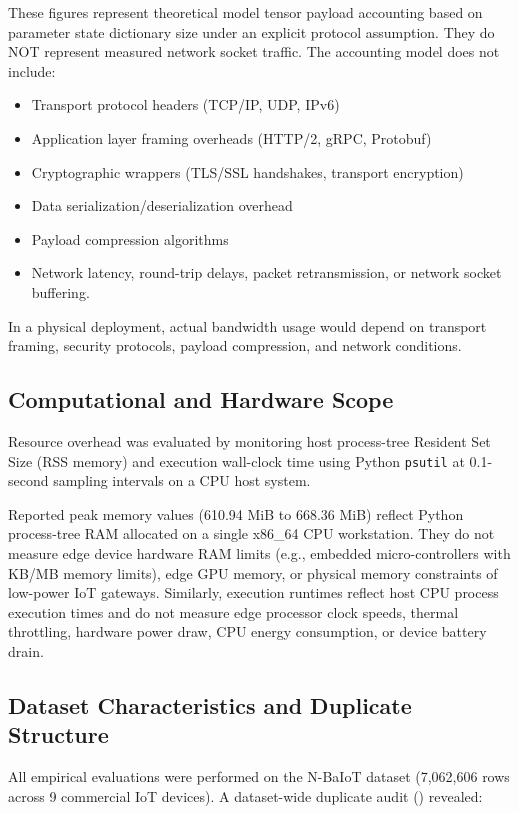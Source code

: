 \documentclass[11pt,a4paper]{article}
\begin{document}
These figures represent theoretical model tensor payload accounting based on parameter state dictionary size under an explicit protocol assumption. They do NOT represent measured network socket traffic. The accounting model does not include:

\begin{itemize}
    \item Transport protocol headers (TCP/IP, UDP, IPv6)
    \item Application layer framing overheads (HTTP/2, gRPC, Protobuf)
    \item Cryptographic wrappers (TLS/SSL handshakes, transport encryption)
    \item Data serialization/deserialization overhead
    \item Payload compression algorithms
    \item Network latency, round-trip delays, packet retransmission, or network socket buffering.
\end{itemize}

In a physical deployment, actual bandwidth usage would depend on transport framing, security protocols, payload compression, and network conditions.

\subsection{Computational and Hardware Scope}
Resource overhead was evaluated by monitoring host process-tree Resident Set Size (RSS memory) and execution wall-clock time using Python \texttt{psutil} at 0.1-second sampling intervals on a CPU host system.

Reported peak memory values (610.94 MiB to 668.36 MiB) reflect Python process-tree RAM allocated on a single x86\_64 CPU workstation. They do not measure edge device hardware RAM limits (e.g., embedded micro-controllers with KB/MB memory limits), edge GPU memory, or physical memory constraints of low-power IoT gateways. Similarly, execution runtimes reflect host CPU process execution times and do not measure edge processor clock speeds, thermal throttling, hardware power draw, CPU energy consumption, or device battery drain.

\subsection{Dataset Characteristics and Duplicate Structure}
All empirical evaluations were performed on the N-BaIoT dataset (7,062,606 rows across 9 commercial IoT devices). A dataset-wide duplicate audit (\texttt{}) revealed:
\end{document}
